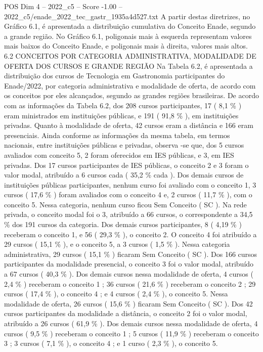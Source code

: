 \begin{textsample}{POS Dim 4 – 2022\_c5 – Score -1.00 – 2022\_c5/enade\_2022\_tec\_gastr\_1935a4d527.txt}
A partir destas diretrizes, no Gráfico 6.1, é apresentada a distribuição cumulativa do Conceito Enade, segundo a grande região.
No Gráfico 6.1, poligonais mais à esquerda representam valores mais baixos do Conceito Enade, e poligonais mais à direita, valores mais altos. 6.2 CONCEITOS POR CATEGORIA ADMINISTRATIVA, MODALIDADE DE OFERTA DOS CURSOS E GRANDE REGIÃO Na Tabela 6.2, é apresentada a distribuição dos cursos de Tecnologia em Gastronomia participantes do Enade/2022, por categoria administrativa e modalidade de oferta, de acordo com os conceitos por eles alcançados, segundo as grandes regiões brasileiras.
De acordo com as informações da Tabela 6.2, dos 208 cursos participantes, 17 ( 8,1 \% ) eram ministrados em instituições públicas, e 191 ( 91,8 \% ), em instituições privadas.
Quanto à modalidade de oferta, 42 cursos eram a distância e 166 eram presenciais.
Ainda conforme as informações da mesma tabela, em termos nacionais, entre instituições públicas e privadas, observa -se que, dos 5 cursos avaliados com conceito 5, 2 foram oferecidos em IES públicas, e 3, em IES privadas.
Dos 17 cursos participantes de IES públicas, o conceito 2 e 3 foram o valor modal, atribuído a 6 cursos cada ( 35,2 \% cada ).
Dos demais cursos de instituições públicas participantes, nenhum curso foi avaliado com o conceito 1, 3 cursos ( 17,6 \% ) foram avaliados com o conceito 4 e, 2 cursos ( 11,7 \% ), com o conceito 5.
Nessa categoria, nenhum curso ficou Sem Conceito ( SC ).
Na rede privada, o conceito modal foi o 3, atribuído a 66 cursos, o correspondente a 34,5 \% dos 191 cursos da categoria.
Dos demais cursos participantes, 8 ( 4,19 \% ) receberam o conceito 1, e 56 ( 29,3 \% ), o conceito 2.
O conceito 4 foi atribuído a 29 cursos ( 15,1 \% ), e o conceito 5, a 3 cursos ( 1,5 \% ).
Nessa categoria administrativa, 29 cursos ( 15,1 \% ) ficaram Sem Conceito ( SC ).
Dos 166 cursos participantes da modalidade presencial, o conceito 3 foi o valor modal, atribuído a 67 cursos ( 40,3 \% ).
Dos demais cursos nessa modalidade de oferta, 4 cursos ( 2,4 \% ) receberam o conceito 1 ; 36 cursos ( 21,6 \% ) receberam o conceito 2 ; 29 cursos ( 17,4 \% ), o conceito 4 ; e 4 cursos ( 2,4 \% ), o conceito 5.
Nessa modalidade de oferta, 26 cursos ( 15,6 \% ) ficaram Sem Conceito ( SC ).
Dos 42 cursos participantes da modalidade a distância, o conceito 2 foi o valor modal, atribuído a 26 cursos ( 61,9 \% ).
Dos demais cursos nessa modalidade de oferta, 4 cursos ( 9,5 \% ) receberam o conceito 1 ; 5 cursos ( 11,9 \% ) receberam o conceito 3 ; 3 cursos ( 7,1 \% ), o conceito 4 ; e 1 curso ( 2,3 \% ), o conceito 5.

\end{textsample}
